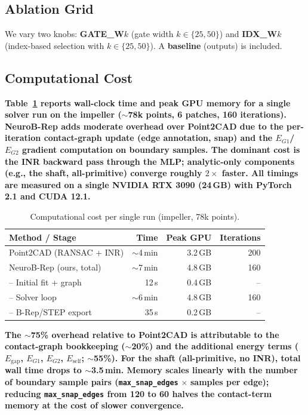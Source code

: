 \documentclass{ieeeaccess}
\providecommand{\DIFaddtex}[1]{{\color{blue}\bfseries #1}} %
\providecommand{\DIFaddbegin}{} %
\providecommand{\DIFadd}[1]{\texorpdfstring{\DIFaddtex{#1}}{#1}} %
\begin{document}
\subsection{Ablation Grid}
We vary two knobs: \textbf{GATE\_W$k$} (gate width $k\in\{25,50\}$) and \textbf{IDX\_W$k$} (index-based selection with $k\in\{25,50\}$). A \textbf{baseline} (outputs) is included.

\DIFaddbegin \subsection{\DIFadd{Computational Cost}}
\label{sec:cost}
\DIFadd{Table~\ref{tab:cost} reports wall-clock time and peak GPU memory for a
single solver run on the impeller ($\sim$78k points, 6 patches, 160 iterations).
NeuroB-Rep adds moderate overhead over Point2CAD due to the per-iteration
contact-graph update (edge annotation, snap) and the $E_{G1}$/$E_{G2}$
gradient computation on boundary samples.
The dominant cost is the INR backward pass through the MLP; analytic-only
components (e.g., the shaft, all-primitive) converge roughly $2{\times}$
faster.
All timings are measured on a single NVIDIA RTX 3090 (24\,GB) with
PyTorch 2.1 and CUDA 12.1.
}

\begin{table}[t]
  \centering
  \footnotesize
  \setlength{\tabcolsep}{4pt}
  \caption{Computational cost per single run (impeller, 78k points).}
  \label{tab:cost}
  \begin{tabular}{l r r r}
    \toprule
    \textbf{Method / Stage} & \textbf{Time} & \textbf{Peak GPU} & \textbf{Iterations} \\
    \midrule
    Point2CAD (RANSAC + INR)   & $\sim$4\,min  & 3.2\,GB & 200 \\
    NeuroB-Rep (ours, total)   & $\sim$7\,min  & 4.8\,GB & 160 \\
    \quad-- Initial fit + graph & 12\,s         & 0.4\,GB & -- \\
    \quad-- Solver loop          & $\sim$6\,min  & 4.8\,GB & 160 \\
    \quad-- B-Rep/STEP export    & 35\,s         & 0.2\,GB & -- \\
    \bottomrule
  \end{tabular}
\end{table}

\DIFadd{The $\sim$75\% overhead relative to Point2CAD is attributable to the
contact-graph bookkeeping ($\sim$20\%) and the additional energy terms
($E_{\text{gap}}$, $E_{G1}$, $E_{G2}$, $E_{\text{self}}$; $\sim$55\%).
For the shaft (all-primitive, no INR), total wall time drops to
$\sim$3.5\,min.
Memory scales linearly with the number of boundary sample pairs
(\texttt{max\_snap\_edges}$\,{\times}\,$samples per edge); reducing
\texttt{max\_snap\_edges} from 120 to 60 halves the contact-term memory
at the cost of slower convergence.
}
\end{document}
